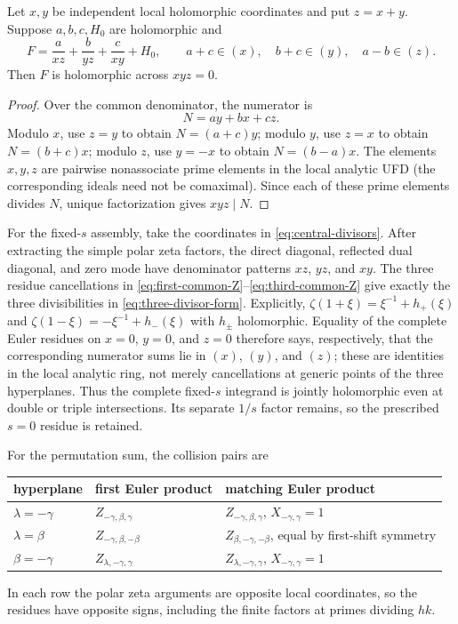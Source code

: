 \begin{lemma}\label{lem:three-divisor}
Let $x,y$ be independent local holomorphic coordinates and put $z=x+y$.
Suppose $a,b,c,H_0$ are holomorphic and
\begin{equation}\label{eq:three-divisor-form}
 F=\frac{a}{xz}+\frac{b}{yz}+\frac{c}{xy}+H_0,\qquad
 a+c\in(x),\quad b+c\in(y),\quad a-b\in(z).
\end{equation}
Then $F$ is holomorphic across $xyz=0$.
\end{lemma}

\begin{proof}
Over the common denominator, the numerator is
\begin{equation}\label{eq:three-divisor-numerator}
                              N=ay+bx+cz.
\end{equation}
Modulo $x$, use $z=y$ to obtain $N=(a+c)y$; modulo $y$, use $z=x$ to
obtain $N=(b+c)x$; modulo $z$, use $y=-x$ to obtain $N=(b-a)x$.
The elements $x,y,z$ are pairwise nonassociate prime elements in the local
analytic UFD (the corresponding ideals need not be comaximal).  Since each
of these prime elements divides $N$, unique factorization gives
$xyz\mid N$.
\end{proof}

For the fixed-$s$ assembly, take the coordinates in
\eqref{eq:central-divisors}.  After extracting the simple polar zeta factors,
the direct diagonal, reflected dual diagonal, and zero mode have denominator
patterns $xz$, $yz$, and $xy$.  The three residue cancellations in
\eqref{eq:first-common-Z}--\eqref{eq:third-common-Z} give exactly the three
divisibilities in \eqref{eq:three-divisor-form}.  Explicitly,
$\zeta(1+\xi)=\xi^{-1}+h_+(\xi)$ and
$\zeta(1-\xi)=-\xi^{-1}+h_-(\xi)$ with $h_\pm$ holomorphic.  Equality of the
complete Euler residues on $x=0$, $y=0$, and $z=0$ therefore says,
respectively, that the corresponding numerator sums lie in $(x)$, $(y)$,
and $(z)$; these are identities in the local analytic ring, not merely
cancellations at generic points of the three hyperplanes.  Thus the complete fixed-$s$
integrand is jointly holomorphic even at double or triple intersections.  Its
separate $1/s$ factor remains, so the prescribed $s=0$ residue is retained.

For the permutation sum, the collision pairs are
\begin{center}
\begin{tabular}{lll}
\toprule
hyperplane & first Euler product & matching Euler product\\
\midrule
$\lambda=-\gamma$
 &$Z_{-\gamma,\beta,\gamma}$
 &$Z_{-\gamma,\beta,\gamma}$, $X_{-\gamma,\gamma}=1$\\
$\lambda=\beta$
 &$Z_{-\gamma,\beta,-\beta}$
 &$Z_{\beta,-\gamma,-\beta}$, equal by first-shift symmetry\\
$\beta=-\gamma$
 &$Z_{\lambda,-\gamma,\gamma}$
 &$Z_{\lambda,-\gamma,\gamma}$, $X_{-\gamma,\gamma}=1$\\
\bottomrule
\end{tabular}
\end{center}
In each row the polar zeta arguments are opposite local coordinates, so the
residues have opposite signs, including the finite factors at primes dividing
$hk$.

